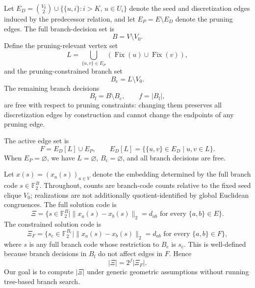 Let $E_D = \binom{V_0}{2} \cup \{\{u,i\} : i>K,\, u \in U_i\}$ denote the seed and discretization edges induced by the predecessor relation, and let $E_P = E\setminus E_D$ denote the pruning edges. The full branch-decision set is
\[
B = V\setminus V_0.
\]
Define the pruning-relevant vertex set
\[
L
=
\bigcup_{\{u,v\}\in E_P}
\left(\operatorname{Fix}(u)\cup \operatorname{Fix}(v)\right),
\]
and the pruning-constrained branch set
\[
B_{\mathrm{c}}=L\setminus V_0.
\]
The remaining branch decisions
\[
B_{\mathrm{f}}=B\setminus B_{\mathrm{c}},
\qquad
f=\lvert B_{\mathrm{f}}\rvert,
\]
are free with respect to pruning constraints: changing them preserves all discretization edges by construction and cannot change the endpoints of any pruning edge.

The active edge set is
\[
F = E_D[L] \cup E_P,
\qquad
E_D[L]=\{\{u,v\}\in E_D \mid u,v\in L\}.
\]
When $E_P=\varnothing$, we have $L=\varnothing$, $B_{\mathrm{c}}=\varnothing$, and all branch decisions are free.

Let $x(s)=(x_a(s))_{a\in V}$ denote the embedding determined by the full branch code $s\in\mathbb{F}_2^B$. Throughout, counts are branch-code counts relative to the fixed seed clique $V_0$; realizations are not additionally quotient-identified by global Euclidean congruences. The full solution code is
\[
\Xi
=
\{s \in \mathbb{F}_2^B \mid
\|x_a(s)-x_b(s)\|_2=d_{ab}
\text{ for every } \{a,b\}\in E\}.
\]
The constrained solution code is
\[
\Xi_F
=
\{s_{\mathrm{c}} \in \mathbb{F}_2^{B_{\mathrm{c}}} \mid
\|x_a(s)-x_b(s)\|_2=d_{ab}
\text{ for every } \{a,b\}\in F\},
\]
where $s$ is any full branch code whose restriction to $B_{\mathrm{c}}$ is $s_{\mathrm{c}}$. This is well-defined because branch decisions in $B_{\mathrm{f}}$ do not affect edges in $F$. Hence
\[
\lvert \Xi\rvert = 2^f \lvert \Xi_F\rvert.
\]
Our goal is to compute $\lvert \Xi\rvert$ under generic geometric assumptions without running tree-based branch search.
